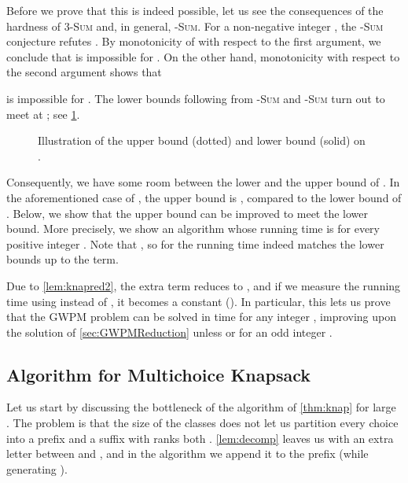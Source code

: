 \documentclass{article}
\theoremstyle{plain}
\theoremstyle{definition}
\newcommand{\GWPM}{\textsc{GWPM}\xspace}
\newcommand{\Sum}{\textsc{Sum}\xspace}
\begin{document}
    Before we prove that this is indeed possible, let us see the consequences of the hardness of 3-\Sum and, in general, -\Sum.   
    For a non-negative integer , the -\Sum conjecture refutes .
    By monotonicity of  with respect to the first argument, we conclude that 
    is impossible for . 
    On the other hand, monotonicity with respect to the second argument shows that
    
    is impossible for . The lower bounds following from -\Sum and -\Sum
    turn out to meet at ; see \cref{fig:graph}.
    
    
       \begin{figure}[hb]
   \begin{center}
\end{center}
\caption{Illustration of the upper bound (dotted) and lower bound (solid) on .}\label{fig:graph}
\end{figure}

  Consequently, we have some room between the lower and the upper bound of .
	In the aforementioned case of , the upper bound is ,
	compared to the lower bound of .
	Below, we show that the upper bound can be improved to meet the lower bound.
	More precisely, we show an algorithm whose running time is 
	for every positive integer .
	Note that , so for  the running time indeed matches the lower bounds up to the  term.
	
	
    Due to \cref{lem:knapred2}, the extra  term reduces to ,
    and if we measure the running time using  instead of , it becomes a constant ().
    In particular, this lets us prove that the \GWPM problem can be solved in  time
    for any integer , improving upon the solution of \cref{sec:GWPMReduction}
    unless  or  for an odd integer .
    

    \subsection{Algorithm for Multichoice Knapsack}\label{app:fastmk}    
	Let us start by discussing the bottleneck of the algorithm of \cref{thm:knap} for large .
	The problem is that the size of the classes does not let us partition every choice  into a prefix  and a suffix 
	with ranks both . \cref{lem:decomp} leaves us with an extra letter  between  and ,
	and in the algorithm we append it to the prefix (while generating ).
\end{document}
